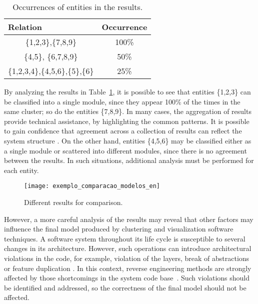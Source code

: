 \begin{table}[h]
	\centering
	\caption{Occurrences of entities in the results.}
	\label{ocorrencias_1}
	\begin{tabular}{|cc|}
		\hline
		\multicolumn{1}{|l}{Relation} & \multicolumn{1}{l|}{Occurrence} \\ \hline
		\{1,2,3\},\{7,8,9\}                  & 100\%                           \\ \hline
		\{4,5\}, \{6,7,8,9\}                    & 50\%                          \\ \hline
		\{1,2,3,4\},\{4,5,6\},\{5\},\{6\}                  & 25\%           \\ \hline
	\end{tabular}
\end{table}

By analyzing the results in Table~\ref{ocorrencias_1}, it is possible to see that entities \{1,2,3\} can be classified into a single module, since they appear 100\% of the times in the same cluster; so do the entities \{7,8,9\}. In many cases, the aggregation of results provide technical assistance, by highlighting the common patterns. It is possible to gain confidence that agreement across a collection of results can reflect the system structure \cite{craft}. On the other hand, entities \{4,5,6\} may be classified either as a single module or scattered into different modules, since there is no agreement between the results. In such situations, additional analysis must be performed for each entity. 

\begin{figure}[!h]
	\centering
	\texttt{[image: exemplo\_comparacao\_modelos\_en]}
	\caption{Different results for comparison.}
	\label{exemplo_comparacao_modelos}
\end{figure}

However, a more careful analysis of the results may reveal that other factors may influence the final model produced by clustering and visualization software techniques. A software system throughout its life cycle is susceptible to several changes in its architecture. However, such operations can introduce architectural violations in the code, for example, violation of the layers, break of abstractions or feature duplication \cite{kazman_view_1998}. In this context, reverse engineering methods are strongly affected by those shortcomings in the system code base~\cite{Platenius_2012}.  Such violations should be identified and addressed, so the correctness of the final model should not be affected.

